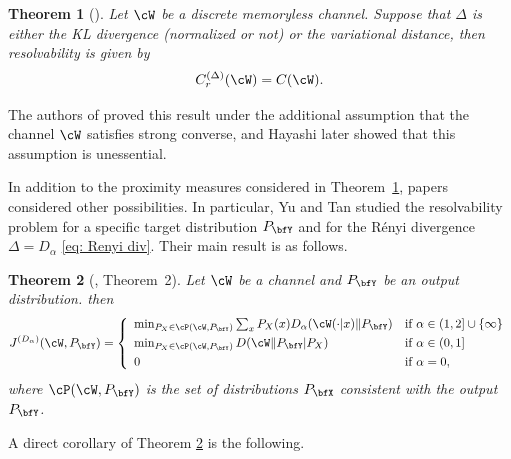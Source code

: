 \documentclass{amsart}
\newtheorem{theorem}{Theorem}[section]
\theoremstyle{remark}
\begin{document}
\begin{theorem}[\cite{han1993approximation,hayashi2006general}]\label{thm: Resolvability thm}
Let $\cW$ be a discrete memoryless channel. 
Suppose that $\Delta$ is either the KL divergence (normalized or not) or the variational distance, then resolvability is given by    
    \begin{align*}
        C_r^{(\Delta)}(\cW) = C(\cW).
    \end{align*}
\end{theorem}
The authors of \cite{han1993approximation} proved this result under the additional assumption that the channel $\cW$ satisfies strong converse, and Hayashi \cite{hayashi2006general} later showed that this assumption is unessential.

In addition to the proximity measures considered in Theorem~\ref{thm: Resolvability thm}, papers  \cite{steinberg1996simulation, liu2016e_, yu2018renyi} considered other possibilities. In particular, Yu and Tan \cite{yu2018renyi} studied the resolvability problem for a specific target distribution $P_{\bfY}$ and for the R{\'e}nyi divergence $\Delta=D_{\alpha}$ \eqref{eq: Renyi div}. 
Their main result is as follows. 
%

\begin{theorem}[\cite{yu2018renyi}, Theorem~2]\label{thm: Renyi resolvability}
Let $\cW$ be a channel and $P_{\bfY}$ be an output distribution. then
\begin{align*}
    J^{(D_\alpha)} (\cW,P_{\bfY}) = 
\left\{
	\begin{array}{lll}
		\min_{P_X \in \cP (\cW,P_{\bfY})}\sum_xP_X(x)D_{\alpha}(\cW(\cdot|x)\|P_{\bfY}) & \mbox{if } \alpha \in (1,2] \cup \{\infty\} \\[.05in]
		\min_{P_X \in \cP (\cW,P_{\bfY})}D(\cW\|P_{\bfY}|P_X) & \mbox{if } \alpha \in (0,1]\\[.05in]
            0 & \mbox{if } \alpha =  0,
	\end{array}
\right.
\end{align*}  
where $\cP (\cW,P_{\bfY})$ is the set of distributions $P_{\bfX}$ consistent with the output $P_{\bfY}$.
\end{theorem}

A direct corollary of Theorem \ref{thm: Renyi resolvability} is the following.
\end{document}
